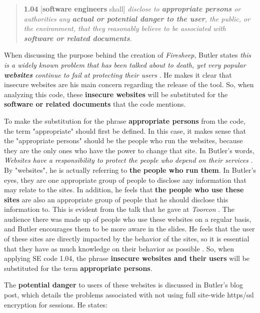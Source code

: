 \documentclass[11pt]{article}
\begin{document}
\begin{multicols}{2}
\begin{quote}
  \textbf{1.04} [\textbf{software engineers} shall] \emph{disclose to \textbf{appropriate persons} or authorities any \textbf{actual or potential danger to the user}, the public, or the environment, that they reasonably believe to be associated with \textbf{software or related documents}.} \cite{se_code}
\end{quote}

When discussing the purpose behind the creation of \emph{Firesheep}, Butler states \emph{this is a widely known problem that has been talked about to death, yet very popular \textbf{websites} continue to fail at protecting their users} \cite{codebutler_main}. He makes it clear that insecure websites are his main concern regarding the release of the tool. So, when analyzing this code, these \textbf{insecure websites} will be substituted for the \textbf{software or related documents}  that the code mentions.

To make the substitution for the phrase \textbf{appropriate persons} from the code, the term "appropriate" should first be defined. In this case, it makes sense that the "appropriate persons" should be the people who run the websites, because they are the only ones who have the power to change that site. In Butler's words, \emph{Websites have a responsibility to protect the people who depend on their services} \cite{codebutler_main}. By "websites", he is actually referring to \textbf{the people who run them}. In Butler's eyes, they are one appropriate group of people to disclose any information that may relate to the sites. In addition, he feels that \textbf{the people who use these sites} are also an appropriate group of people that he should disclose this information to. This is evident from the talk that he gave at \emph{Toorcon} \cite{toorcon_slides}. The audience there was made up of people who use these websites on a regular basis, and Butler encourages them to be more aware in the slides. He feels that the user of these sites are directly impacted by the behavior of the sites, so it is essential that they have as much knowledge on their behavior as possible \cite{toorcon_slides}. So, when applying SE code 1.04, the phrase \textbf{insecure websites and their users} will be substituted for the term \textbf{appropriate persons}.

The \textbf{potential danger} to users of these websites is discussed in Butler's blog post, which details the problems associated with not using full site-wide https/ssl encryption for sessions. He states:


\end{multicols}
\end{document}
